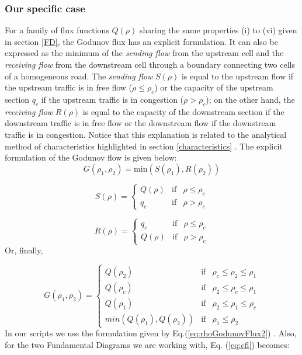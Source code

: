 \documentclass[letterpaper,10pt]{article}
\begin{document}
\subsubsection{Our specific case}\label{SpecificCase}

For a family of flux functions $Q(\rho)$ sharing the same properties (i) to (vi) given in section \ref{FD}, the Godunov flux has an explicit formulation. It can also be expressed as the minimum of the \textit{sending flow} from the upstream cell and the \textit{receiving flow} from the downstream cell through a boundary connecting two cells of a homogeneous road. The \textit{sending flow} $S(\rho)$ is equal to the upstream flow if the upstream traffic is in free flow ($\rho \leq \rho_{c}$) or the capacity of the upstream section $q_{c}$ if the upstream traffic is in congestion ($\rho > \rho_{c}$); on the other hand, the \textit{receiving flow} $R(\rho)$ is equal to the capacity of the downstream section if the downstream traffic is in free flow or the downstream flow if the downstream traffic is in congestion. Notice that this explanation is related to the analytical method of characteristics highlighted in section \ref{characteristics} . The explicit formulation of the Godunov flow is given below: 
\begin{equation} \label{eq:rhoGodunovFlux1}
G(\rho_{1},\rho_{2}) = \text{min}(S(\rho_{1}),R(\rho_{2}))
\end{equation}

\begin{equation} \label{eq:sendingFlow1}
S(\rho) = \left\{ \begin{array}{lll}
Q(\rho) & \text{if} & \rho \leq \rho_{c} \\
q_{c} &  \text{if} & \rho > \rho_{c}
\end{array}\right.
\end{equation}

\begin{equation} \label{eq:receivingFlow1}
R(\rho) = \left\{ \begin{array}{lll}
q_{c} & \text{if} & \rho \leq \rho_{c} \\
Q(\rho) &  \text{if} & \rho > \rho_{c}
\end{array}\right.
\end{equation}
\noindent Or, finally,

\begin{equation} \label{eq:rhoGodunovFlux2}
G(\rho_{1},\rho_{2}) = \left\{ \begin{array}{lll}
Q(\rho_{2}) & \text{if} & \rho_{c} \leq \rho_{2} \leq \rho_{1} \\
Q(\rho_{c}) & \text{if} & \rho_{2} \leq \rho_{c} \leq \rho_{1} \\
Q(\rho_{1}) & \text{if} & \rho_{2} \leq \rho_{1} \leq \rho_{c} \\
min(Q(\rho_{1}),Q(\rho_{2})) & \text{if} & \rho_{1} \leq \rho_{2}
\end{array}\right.
\end{equation}
 In our scripts we use the formulation given by Eq.(\ref{eq:rhoGodunovFlux2}) .
 Also, for the two Fundamental Diagrams we are working with, Eq. (\ref{eq:cfl}) becomes:
 
\end{document}

